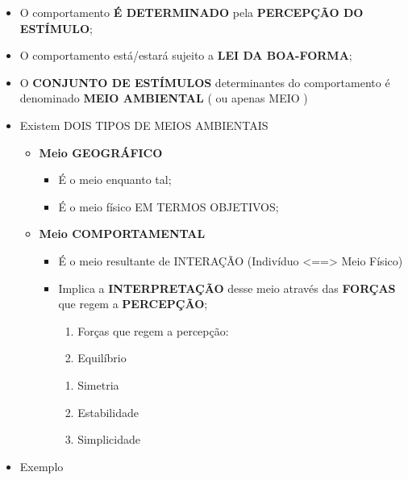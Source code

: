 \documentclass[
]{book}
\providecommand{\tightlist}{%
  \setlength{\itemsep}{0pt}\setlength{\parskip}{0pt}}
\begin{document}
\begin{itemize}
\tightlist
\item
  O comportamento \textbf{É DETERMINADO} pela \textbf{PERCEPÇÃO DO ESTÍMULO};
\item
  O comportamento está/estará sujeito a \textbf{LEI DA BOA-FORMA};
\item
  O \textbf{CONJUNTO DE ESTÍMULOS} determinantes do comportamento é denominado \textbf{MEIO AMBIENTAL} ( ou apenas MEIO )
\item
  Existem DOIS TIPOS DE MEIOS AMBIENTAIS

  \begin{itemize}
  \tightlist
  \item
    \textbf{Meio GEOGRÁFICO}

    \begin{itemize}
    \tightlist
    \item
      É o meio enquanto tal;
    \item
      É o meio físico EM TERMOS OBJETIVOS;
    \end{itemize}
  \item
    \textbf{Meio COMPORTAMENTAL}

    \begin{itemize}
    \tightlist
    \item
      É o meio resultante de INTERAÇÃO (Indivíduo \textless==\textgreater{} Meio Físico)
    \item
      Implica a \textbf{INTERPRETAÇÃO} desse meio através das \textbf{FORÇAS} que regem a \textbf{PERCEPÇÃO};

      \begin{enumerate}
      \def\labelenumi{\alph{enumi}.}
      \tightlist
      \item
        Forças que regem a percepção:
      \item
        Equilíbrio
      \end{enumerate}

      \begin{enumerate}
      \def\labelenumi{\roman{enumi}.}
      \setcounter{enumi}{1}
      \tightlist
      \item
        Simetria
      \item
        Estabilidade
      \item
        Simplicidade
      \end{enumerate}
    \end{itemize}
  \end{itemize}
\item
  Exemplo


\end{itemize}
\end{document}
